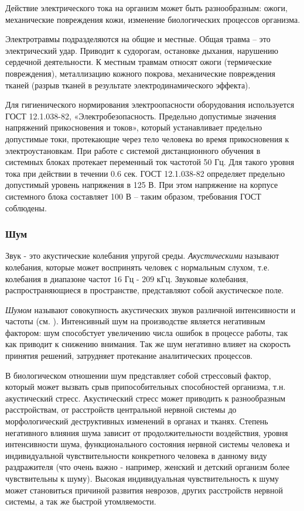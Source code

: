 Действие электрического тока на организм может быть разнообразным: ожоги, механи\-ческие повреждения кожи, изменение биологических процессов организма.

Электротравмы  подразделяются на общие и местные. Общая травма – это электри\-ческий удар. Приводит к судорогам, остановке дыхания, нарушению сердечной деятель\-ности. К местным травмам относят ожоги (термические повреждения), металлизацию кожного покрова, механические повреждения тканей (разрыв тканей в результате  электро\-динамического эффекта).

Для гигиенического нормирования электроопасности оборудования ис\-пользуется ГОСТ 12.1.038-82, «Электробезопасность. Предельно допустимые значе\-ния напряжений  прикос\-новения и токов», который устанавливает пре\-дельно допустимые токи, протекающие через тело человека во время при\-косновения к электроустановкам.
При работе с системой дистанционного обу\-чения в сис\-темных блоках протекает переменный ток частотой 50 Гц. Для такого уровня тока при действии в течении 0.6 сек. ГОСТ 12.1.038-82 опреде\-ляет предельно допустимый уровень напряжения в 125 В. При этом напря\-жение на корпусе системного блока составляет 100 В – таким образом, требо\-вания ГОСТ соблюдены.

\subsubsection{Шум}

Звук - это акустические колебания упругой среды. {\itshape Акустическими} на\-зывают колебания, которые может воспринять человек с нормальным слухом, т.е. колебания в диапазоне частот $16$ Гц - $209$ кГц. Звуковые колебания, распро\-страняющиеся в пространстве, предста\-вляют собой акустическое поле.

{\itshape Шумом} называют совокупность акустических звуков различной интен\-сивности и часто\-ты (см. \cite{10.}). Интенсивный шум на производстве является негативным фактором: шум способстует увеличению числа ошибок в процессе работы, так как приводит к снижению внимания. Так же шум негативно влияет на скорость принятия решений, затрудняет протекание аналитических процессов.

В биологическом отношении шум представляет собой стрессовый фактор, который может вызвать срыв припособительных способностей организма, т.н. акустический стресс. Акустический стресс может приводить к разнообразным расстройствам, от расстройств центральной нервной системы до морфоло\-гический деструктивных изменений в органах и тканях. Степень негативного влияния шума зависит от продолжительности воздействия, уровня интенсив\-ности шума, функционального состояния нервной системы человека и индиви\-дуальной чувствительности конкретного человека в данному виду раздражи\-теля (что очень важно - например, женский и детский организм более чувстви\-тельны к шуму). Высокая индивидуальная чувствительность к шуму может становиться причиной развития неврозов, других расстройств нервной сис\-темы, а так же быстрой утомляемости.

